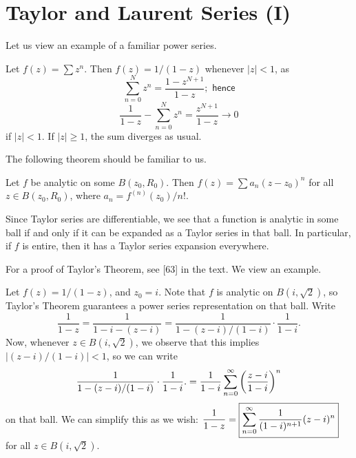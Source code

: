 \documentclass{article}
\begin{document}
\section{Taylor and Laurent Series (I)}
Let us view an example of a familiar power series.
\begin{example}
Let $f(z) = \sum z^n$. Then $f(z) = 1/(1-z)$ whenever $|z|<1$, as
$$\sum_{n=0}^N z^n = \frac{1-z^{N+1}}{1-z}; \textsf{ hence}$$
$$\frac 1{1-z} - \sum_{n=0}^N z^n = \frac{z^{N+1}}{1-z}\to 0$$
if $|z|<1$. If $|z|\geq 1$, the sum diverges as usual.
\end{example}
The following theorem should be familiar to us.
\begin{theorem}
Let $f$ be analytic on some $B(z_0, R_0)$. Then $f(z) = \sum a_n(z-z_0)^n$ for all $z\in B(z_0, R_0)$, where $a_n = f^{(n)}(z_0)/n!$. 
\end{theorem}
Since Taylor series are differentiable, we see that a function is analytic in some ball if and only if it can be expanded as a Taylor series in that ball. In particular, if $f$ is entire, then it has a Taylor series expansion everywhere.

For a proof of Taylor's Theorem, see [63] in the text. We view an example. \newpage
\begin{example}
Let $f(z) = 1/(1-z)$, and $z_0=  i$. Note that $f$ is analytic on $B(i, \sqrt 2)$, so Taylor's Theorem guarantees a power series representation on that ball. Write
$$\frac 1{1-z} = \frac 1{1-i-(z-i)} = \frac 1{1 - (z-i)/(1-i)} \cdot \frac 1{1-i}.$$
Now, whenever $z\in B(i, \sqrt 2)$, we observe that this implies $|(z-i)/(1-i)| < 1$, so we can write
$$\frac 1{1 - (z-i)/(1-i)} \cdot \frac 1{1-i}. = \frac 1{1-i}\sum_{n=0}^\infty \left(\frac{z-i}{1-i} \right)^n$$
on that ball. We can simplify this as we wish: $\displaystyle\frac 1{1-z} = \boxed{\sum_{n=0}^\infty \frac 1{(1-i)^{n+1}}(z-i)^n}$ for all $z\in B(i, \sqrt 2)$.
\end{example}
\end{document}
